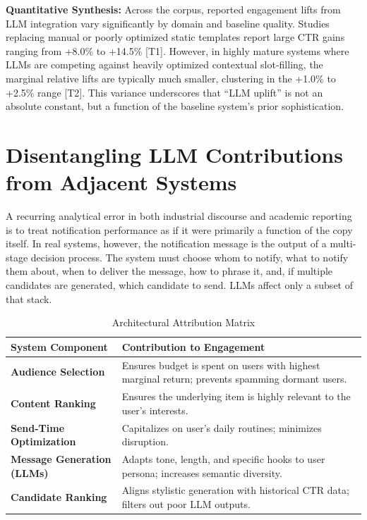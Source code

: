 \documentclass[sigconf]{acmart}
\begin{document}
\textbf{Quantitative Synthesis:} Across the corpus, reported engagement lifts from LLM integration vary significantly by domain and baseline quality. Studies replacing manual or poorly optimized static templates report large CTR gains ranging from +8.0\% to +14.5\% \cite{bie2026pushgen, acm2025ecommerce} [T1]. However, in highly mature systems where LLMs are competing against heavily optimized contextual slot-filling, the marginal relative lifts are typically much smaller, clustering in the +1.0\% to +2.5\% range \cite{sinha2024doordash} [T2]. This variance underscores that ``LLM uplift'' is not an absolute constant, but a function of the baseline system's prior sophistication.

\section{Disentangling LLM Contributions from Adjacent Systems}

A recurring analytical error in both industrial discourse and academic reporting is to treat notification performance as if it were primarily a function of the copy itself. In real systems, however, the notification message is the output of a multi-stage decision process. The system must choose whom to notify, what to notify them about, when to deliver the message, how to phrase it, and, if multiple candidates are generated, which candidate to send. LLMs affect only a subset of that stack.

\begin{table}[h]
\caption{Architectural Attribution Matrix}
\label{tab:attribution}
\begin{tabular}{p{2.5cm}p{5cm}}
\toprule
\textbf{System Component} & \textbf{Contribution to Engagement} \\
\midrule
\textbf{Audience Selection} & Ensures budget is spent on users with highest marginal return; prevents spamming dormant users. \\
\textbf{Content Ranking} & Ensures the underlying item is highly relevant to the user's interests. \\
\textbf{Send-Time Optimization} & Capitalizes on user's daily routines; minimizes disruption. \\
\textbf{Message Generation (LLMs)} & Adapts tone, length, and specific hooks to user persona; increases semantic diversity. \\
\textbf{Candidate Ranking} & Aligns stylistic generation with historical CTR data; filters out poor LLM outputs. \\
\bottomrule
\end{tabular}
\end{table}
\end{document}

